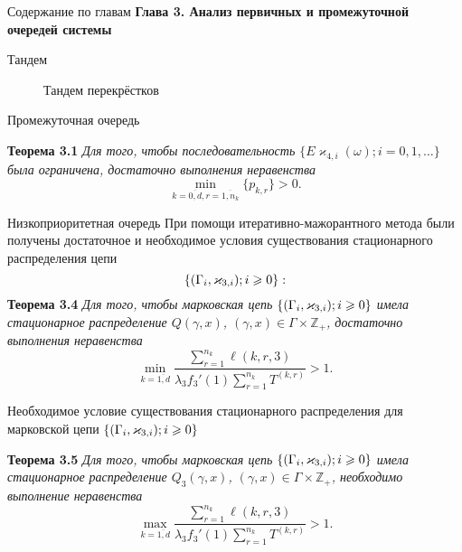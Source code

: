 \documentclass[10pt]{beamer}
\newcommand*{\hm}[1]{#1\nobreak\discretionary{}%
	{\hbox{$\mathsurround=0pt #1$}}{}}%
\newcommand{\MarkThree}{\{(\Gamma_i, \varkappa_{3,i}); \hm{} i \geqslant 0\}}
\begin{document}
  \begin{frame}{Содержание по главам}
  \Large{\textbf{Глава 3. Анализ первичных и промежуточной очередей системы}}\par


      \end{frame}
\begin{frame}{Тандем}
        \begin{figure}[h]
    \centering
    \caption{Тандем перекрёстков}
    \label{VK:fig:1}
  \end{figure}
\end{frame}

        \begin{frame}{Промежуточная очередь}
        \begin{block}
 {\bf Теорема 3.1}
{\it 
Для того, чтобы последовательность $\{E\varkappa_{4,i}(\omega); i =0, 1, \ldots\}$ была ограничена, достаточно выполнения неравенства
\begin{equation*}
    \min_{k=\overline{0,d}, r=\overline{1,n_k}} {\{p_{k,r}\}} > 0.
\end{equation*}
}
\end{block}
      \end{frame}


        \begin{frame}[allowframebreaks]{Низкоприоритетная очередь}
При помощи итеративно-мажорантного метода были получены достаточное и необходимое условия существования стационарного распределения цепи $$\MarkThree:$$
 {\bf Теорема 3.4}
{\it 
Для того, чтобы марковская цепь $\MarkThree$ имела стационарное распределение $Q(\gamma,x)$, $(\gamma,x)\in \Gamma \times {\mathbb Z}_+$, достаточно выполнения неравенства 
\begin{equation}
\min_{k=\overline{1,d}} { \frac{\sum_{r = 1}^{n_k} \ell(k,r,3) }{\lambda_3 f_3'(1) \sum_{r=1}^{n_k} T^{(k,r)} }}>1.
\label{sufficient:low}
\end{equation}
}
\framebreak

Необходимое условие существования стационарного распределения для марковской цепи $\MarkThree$ 

 {\bf Теорема 3.5}
{\it 
Для того, чтобы марковская цепь $\MarkThree$ имела стационарное распределение $Q_3(\gamma,x)$, $(\gamma,x)\in \Gamma \times {\mathbb Z}_+$, необходимо выполнение неравенства
$$
\max_{k=\overline{1,d}} { \frac{\sum_{r = 1}^{n_{k}}\ell(k,r,3)}{\lambda_3 f_3'(1) \sum_{r = 1}^{n_k} T^{(k,r)}} } >1.
$$
}

\end{frame}
\end{document}
